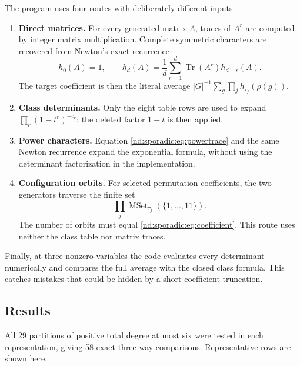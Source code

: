 \documentclass[10pt]{article}
\newcommand{\MSet}{\operatorname{MSet}}
\begin{document}
The program uses four routes with deliberately different inputs.
\begin{enumerate}[leftmargin=*,itemsep=3pt]
\item \textbf{Direct matrices.}  For every generated matrix $A$, traces of
$A^r$ are computed by integer matrix multiplication.  Complete symmetric
characters are recovered from Newton's exact recurrence
\[
h_0(A)=1,\qquad
h_d(A)=\frac1d\sum_{r=1}^d\operatorname{Tr}(A^r)h_{d-r}(A).
\]
The target coefficient is then the literal average
$|G|^{-1}\sum_g\prod_jh_{\tau_j}(\rho(g))$.
\item \textbf{Class determinants.}  Only the eight table rows are used to
expand $\prod_r(1-t^r)^{-c_r}$; the deleted factor $1-t$ is then applied.
\item \textbf{Power characters.}  Equation \eqref{nd:sporadic:eq:powertrace} and the
same Newton recurrence expand the exponential formula, without using the
determinant factorization in the implementation.
\item \textbf{Configuration orbits.}  For selected permutation coefficients,
the two generators traverse the finite set
\[
\prod_j\MSet_{\tau_j}(\{1,\ldots,11\}).
\]
The number of orbits must equal \eqref{nd:sporadic:eq:coefficient}.  This route uses
neither the class table nor matrix traces.
\end{enumerate}

Finally, at three nonzero variables the code evaluates every determinant
numerically and compares the full average with the closed class formula.
This catches mistakes that could be hidden by a short coefficient truncation.

\subsection{Results}

All 29 partitions of positive total degree at most six were tested in each
representation, giving 58 exact three-way comparisons.  Representative rows
are shown here.
\end{document}
